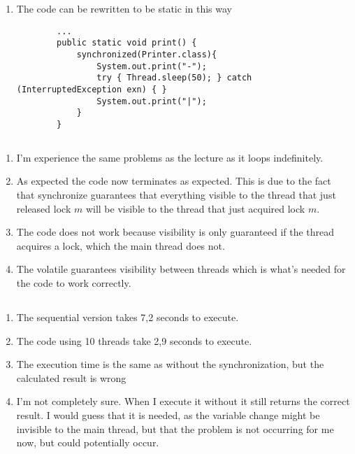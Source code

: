 \documentclass{tufte-handout}
\begin{document}
\begin{enumerate}
    \item The code can be rewritten to be static in this way
    \begin{fullwidth}
      \begin{lstlisting}
        ...
        public static void print() {
            synchronized(Printer.class){
                System.out.print("-");
                try { Thread.sleep(50); } catch (InterruptedException exn) { }
                System.out.print("|");
            }
        }
      \end{lstlisting}
    \end{fullwidth}
  \end{enumerate}


\subsection{}

\begin{enumerate}
  \item I'm experience the same problems as the lecture as it loops indefinitely.
  \item As expected the code now terminates as expected. This is due to the fact that synchronize guarantees that everything visible to the thread that just released lock $m$ will be visible to the thread that just acquired lock $m$.
  \item The code does not work because visibility is only guaranteed if the thread acquires a lock, which the main thread does not.
  \item The volatile guarantees visibility between threads which is what's needed for the code to work correctly.
\end{enumerate}

\subsection{}

\begin{enumerate}
  \item The sequential version takes 7,2 seconds to execute.
  \item The code using 10 threads take 2,9 seconds to execute.
  \item The execution time is the same as without the synchronization, but the calculated result is wrong
  \item I'm not completely sure. When I execute it without it still returns the correct result. I would guess that it is needed, as the variable change might be invisible to the main thread, but that the problem is not occurring for me now, but could potentially occur.
\end{enumerate}
\end{document}
